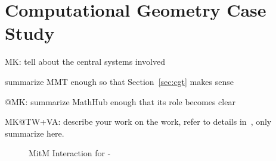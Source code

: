 \section{Computational Geometry Case Study}\label{sec:case}
\begin{todolist}{MK: tell about the central systems involved}
\item summarize MMT enough so that Section~\ref{sec:cgt} makes sense
\item @MK: summarize MathHub enough that its role becomes clear
\item MK@TW+VA: describe your work on the \SCSCP work, refer to details
  in~\cite{twiesing:msc17}, only summarize here.
\end{todolist}

\begin{figure}[ht]\centering
  \caption{MitM Interaction for \GAP-\Singular}\label{fig:mitmpoc}
\end{figure}

